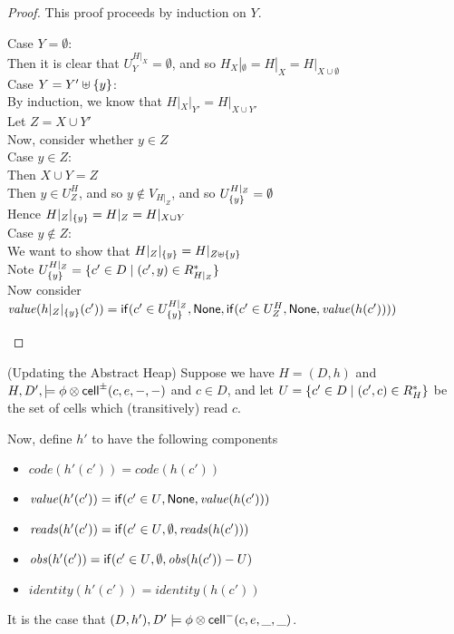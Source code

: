 \begin{proof}
This proof proceeds by induction on $Y$. 
\begin{tabbedproof}
\oo Case $Y = \emptyset$: \\
\ooo Then it is clear that $U^{H|_X}_Y = \emptyset$, and so $H_X|_\emptyset = H|_X = H|_{X \cup \emptyset}$ \\
\oo Case $Y = Y' \uplus \{{y}\}$: \\
\ooo By induction, we know that $H|_X|_{Y'} = H|_{X \cup Y'}$ \\ 
\ooo Let $Z = X \cup Y'$ \\ 
\ooo Now, consider whether $y \in Z$ \\
\ooo Case $y \in Z$: \\
\oooo Then $X \cup Y = Z$ \\
\oooo Then $y \in U^H_Z$, and so $y \not\in V_{H|_Z}$, and so $U^{H|_Z}_{\{{y}\}} = \emptyset$ \\
\oooo Hence $H|_Z|_{\{{y}\}} = H|_Z = H|_{X \cup Y}$ \\
\ooo Case $y \not\in Z$: \\
\oooo We want to show that $H|_Z|_{\{{y}\}} = H|_{Z \uplus \{{y}\}}$ \\
\oooo Note $U^{H|_Z}_{\{{y}\}} = \{{{c' \in D}\;|\;{(c', y) \in R^*_{H|_Z}}}\}$ \\
\oooo Now consider $\mathit{value}(h|_Z|_{\{{y}\}}(c')) = \mathsf{if}({c' \in U^{H|_Z}_{\{{y}\}}}, {\mathsf{None}}, {\mathsf{if}({c' \in U^H_Z}, {\mathsf{None}}, {\mathit{value}(h(c'))})})$
\end{tabbedproof}
\end{proof}


\begin{lemma}{(Updating the Abstract Heap)}
Suppose we have $H = (D,h)$ and $H, D', \models \phi \otimes
\mathsf{cell}^{\pm}({c}, {e}, {-}, {-})$ and $c \in D$, and let $U = \{{{c' \in
  D}\;|\;{(c',c) \in R^*_H}}\}$ be the set of cells which (transitively)
read $c$.

Now, define $h'$ to have the following components
\begin{itemize}
\item $\mathit{code}(h'(c')) = \mathit{code}(h(c'))$
\item $\mathit{value}(h'(c')) = \mathsf{if}({c'\in U}, {\mathsf{None}}, {\mathit{value}(h(c'))})$
\item $\mathit{reads}(h'(c')) = \mathsf{if}({c'\in U}, {\emptyset}, {\mathit{reads}(h(c'))})$
\item $\mathit{obs}(h'(c')) = \mathsf{if}({c'\in U}, {\emptyset}, {\mathit{obs}(h(c')) - U})$
\item $\mathit{identity}(h'(c')) = \mathit{identity}(h(c'))$
\end{itemize}

It is the case that $(D, h'), D' \models \phi \otimes \mathsf{cell}^{-}({c}, {e}, {\_}, {\_})$. 
\end{lemma}

